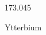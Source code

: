 \documentclass[12pt]{article}
\begin{document}
\hfill{}
\vfill
\begin{center}
  {\fontsize{50}{60}
  }

  \vspace{1em}

  173.045

Ytterbium
\end{center}
\vfill
\end{document}
